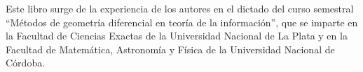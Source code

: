 Este  libro surge  de la experiencia  de los  autores en el  dictado del
  curso semestral ``M\'etodos de geometr\'ia diferencial en teor\'ia de la
  informaci\'on'',  que se  imparte  en la  Facultad  de Ciencias  Exactas de  la
  Universidad  Nacional  de   La  Plata  y  en  la   Facultad  de  Matem\'atica,
  Astronom\'ia y F\'isica de la Universidad Nacional de C\'ordoba.  
